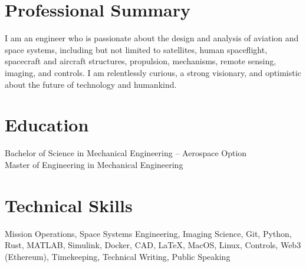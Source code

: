 \documentclass[10pt,final,sans]{resume}
\begin{document}
\setlength\headheight{28pt} %
 

\section{Professional Summary}
I am an engineer who is passionate about the design and analysis of aviation and
space systems, including but not limited to satellites, human spaceflight,
spacecraft and aircraft structures, propulsion, mechanisms, remote sensing,
imaging, and controls. I am relentlessly curious, a strong visionary, and
optimistic about the future of technology and humankind.

\section{Education}
Bachelor of Science in Mechanical Engineering -- Aerospace Option \\
Master of Engineering in Mechanical Engineering

\section{Technical Skills}
Mission Operations, Space Systems Engineering, Imaging Science, Git, Python, Rust, MATLAB, Simulink, Docker, CAD,
{\textrm \LaTeX}, MacOS, Linux, Controls, Web3 (Ethereum), Timekeeping, Technical Writing, Public Speaking
\end{document}
